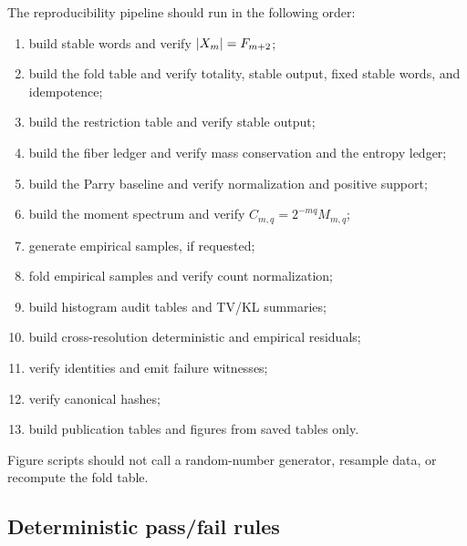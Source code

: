 The reproducibility pipeline should run in the following order:
\begin{enumerate}[leftmargin=2em]
\item build stable words and verify \(\left|X_m\right|=F_{m+2}\);
\item build the fold table and verify totality, stable output, fixed stable words, and idempotence;
\item build the restriction table and verify stable output;
\item build the fiber ledger and verify mass conservation and the entropy ledger;
\item build the Parry baseline and verify normalization and positive support;
\item build the moment spectrum and verify \(C_{m,q}=2^{-mq}M_{m,q}\);
\item generate empirical samples, if requested;
\item fold empirical samples and verify count normalization;
\item build histogram audit tables and TV/KL summaries;
\item build cross-resolution deterministic and empirical residuals;
\item verify identities and emit failure witnesses;
\item verify canonical hashes;
\item build publication tables and figures from saved tables only.
\end{enumerate}
Figure scripts should not call a random-number generator, resample data, or recompute the fold table.

\subsection{Deterministic pass/fail rules}

